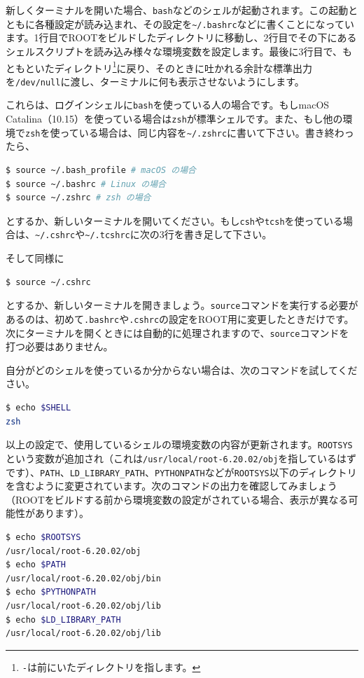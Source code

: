 {新しくターミナルを開いた場合、\texttt{bash}などのシェルが起動されます。この起動とともに各種設定が読み込まれ、その設定を\texttt{\~{}/.bashrc}などに書くことになっています。1行目でROOTをビルドしたディレクトリに移動し、2行目でその下にあるシェルスクリプトを読み込み様々な環境変数を設定します。最後に3行目で、もともといたディレクトリ\footnote{\texttt{-}は前にいたディレクトリを指します。}に戻り、そのときに吐かれる余計な標準出力を\texttt{/dev/null}に渡し、ターミナルに何も表示させないようにします。

これらは、ログインシェルに\texttt{bash}を使っている人の場合です。もしmacOS Catalina（10.15）を使っている場合は\texttt{zsh}が標準シェルです。また、もし他の環境で\texttt{zsh}を使っている場合は、同じ内容を\texttt{\~{}/.zshrc}に書いて下さい。書き終わったら、
\begin{lstlisting}[language=bash]
$ source ~/.bash_profile # macOS の場合
$ source ~/.bashrc # Linux の場合
$ source ~/.zshrc # zsh の場合
\end{lstlisting}
とするか、新しいターミナルを開いてください。もし\texttt{csh}や\texttt{tcsh}を使っている場合は、\texttt{\~{}/.cshrc}や\texttt{\~{}/.tcshrc}に次の3行を書き足して下さい。
\begin{NoFloat}

\end{NoFloat}
そして同様に
\begin{lstlisting}[language=bash]
$ source ~/.cshrc
\end{lstlisting}
とするか、新しいターミナルを開きましょう。\texttt{source}コマンドを実行する必要があるのは、初めて\texttt{.bashrc}や\texttt{.cshrc}の設定をROOT用に変更したときだけです。次にターミナルを開くときには自動的に処理されますので、\texttt{source}コマンドを打つ必要はありません。

自分がどのシェルを使っているか分からない場合は、次のコマンドを試してください。
\begin{lstlisting}[language=bash]
$ echo $SHELL
zsh
\end{lstlisting}

以上の設定で、使用しているシェルの環境変数の内容が更新されます。\texttt{ROOTSYS}という変数が追加され（これは\texttt{/usr/local/root-6.20.02/obj}を指しているはずです）、\texttt{PATH}、\texttt{LD\_LIBRARY\_PATH}、\texttt{PYTHONPATH}などが\texttt{ROOTSYS}以下のディレクトリを含むように変更されています。次のコマンドの出力を確認してみましょう（ROOTをビルドする前から環境変数の設定がされている場合、表示が異なる可能性があります）。
\begin{lstlisting}[language=bash]
$ echo $ROOTSYS
/usr/local/root-6.20.02/obj
$ echo $PATH
/usr/local/root-6.20.02/obj/bin
$ echo $PYTHONPATH
/usr/local/root-6.20.02/obj/lib
$ echo $LD_LIBRARY_PATH
/usr/local/root-6.20.02/obj/lib
\end{lstlisting}

}

